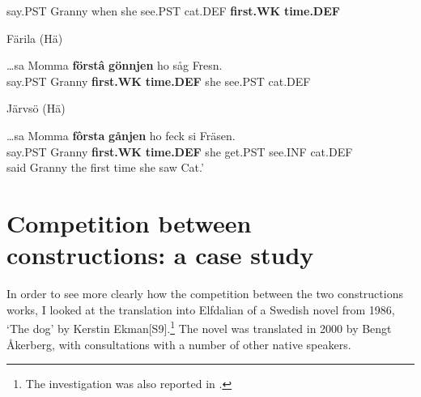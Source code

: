 say.PST  Granny  when  she  see.PST  cat.DEF  \textbf{first.WK} \textbf{time.DEF}\\

\item 

Färila (Hä)



 \ea\label{}
\gll …sa  Momma  \textbf{förstâ} \textbf{gönnjen} ho  såg  Fresn.\\


say.PST  Granny  \textbf{first.WK} \textbf{time.DEF} she  see.PST  cat.DEF\\

\item 

Järvsö (Hä)



 \ea\label{}
\gll …sa  Momma  \textbf{fôrsta}\textbf{  gånjen} ho  feck  si  Fräsen.\\


say.PST  Granny  \textbf{first.WK} \textbf{time.DEF} she  get.PST  see.INF  cat.DEF\\

 said Granny the first time she saw Cat.’

\z

\section{Competition between constructions: a case study}

In order to see more clearly how the competition between the two constructions works, I looked at the translation into Elfdalian of a Swedish novel from 1986,  ‘The dog’ by Kerstin Ekman[S9].\footnote{ The investigation was also reported in \citet{Dahl2004}.} The novel was translated in 2000 by Bengt Åkerberg, with consultations with a number of other native speakers. 

